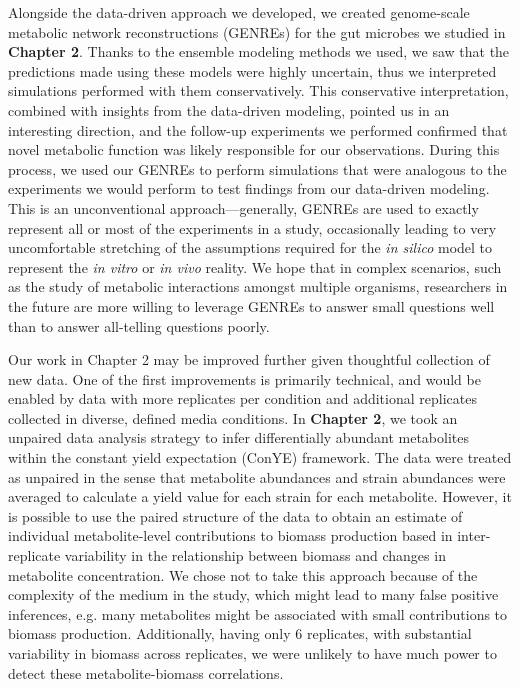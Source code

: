 \documentclass[11pt,onecolumn,notitlepage,openany,twoside]{book}
\begin{document}
\begin{refsection}
Alongside the data-driven approach we developed, we created genome-scale metabolic network reconstructions (GENREs) for the gut microbes we studied in \textbf{Chapter 2}. Thanks to the ensemble modeling methods we used, we saw that the predictions made using these models were highly uncertain, thus we interpreted simulations performed with them conservatively. This conservative interpretation, combined with insights from the data-driven modeling, pointed us in an interesting direction, and the follow-up experiments we performed confirmed that novel metabolic function was likely responsible for our observations. During this process, we used our GENREs to perform simulations that were analogous to the experiments we would perform to test findings from our data-driven modeling. This is an unconventional approach---generally, GENREs are used to exactly represent all or most of the experiments in a study, occasionally leading to very uncomfortable stretching of the assumptions required for the \textit{in silico} model to represent the \textit{in vitro} or \textit{in vivo} reality. We hope that in complex scenarios, such as the study of metabolic interactions amongst multiple organisms, researchers in the future are more willing to leverage GENREs to answer small questions well than to answer all-telling questions poorly.

Our work in Chapter 2 may be improved further given thoughtful collection of new data. One of the first improvements is primarily technical, and would be enabled by data with more replicates per condition and additional replicates collected in diverse, defined media conditions. In \textbf{Chapter 2}, we took an unpaired data analysis strategy to infer differentially abundant metabolites within the constant yield expectation (ConYE) framework. The data were treated as unpaired in the sense that metabolite abundances and strain abundances were averaged to calculate a yield value for each strain for each metabolite. However, it is possible to use the paired structure of the data to obtain an estimate of individual metabolite-level contributions to biomass production based in inter-replicate variability in the relationship between biomass and changes in metabolite concentration. We chose not to take this approach because of the complexity of the medium in the study, which might lead to many false positive inferences, e.g. many metabolites might be associated with small contributions to biomass production. Additionally, having only 6 replicates, with substantial variability in biomass across replicates, we were unlikely to have much power to detect these metabolite-biomass correlations.


\end{refsection}
\end{document}
